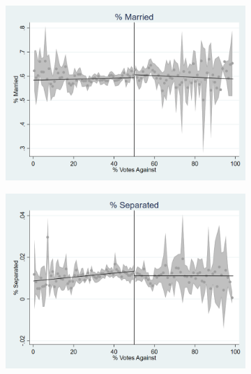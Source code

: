 \begin{figure}[ht]
    \centering
    \begin{minipage}[b]{0.48\textwidth}
        \centering
        \begin{subfigure}[b]{\textwidth}
            \centering
            \includegraphics[width=\textwidth,keepaspectratio]{images/cov_smoothness_pctmarried.png}
            \label{fig:pctmarried_sm}
        \end{subfigure}
    \end{minipage}
    \hfill
    \begin{minipage}[b]{0.48\textwidth}
        \centering
        \begin{subfigure}[b]{\textwidth}
            \centering
            \includegraphics[width=\textwidth,keepaspectratio]{images/cov_smoothness_pctseparated.png}
            \label{fig:pctseparated_sm}
        \end{subfigure}
    \end{minipage}


\end{figure}

